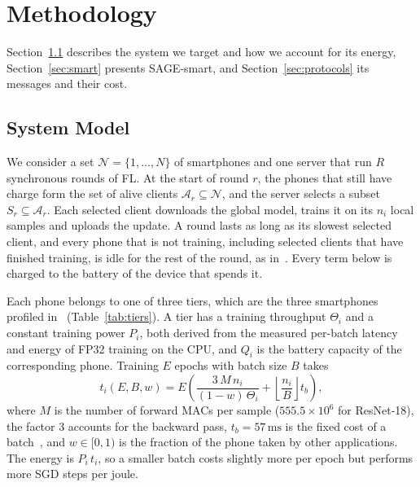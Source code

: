 \section{Methodology}
\label{sec:methodology}

Section~\ref{sec:system} describes the system we target and how we account
for its energy, Section~\ref{sec:smart} presents SAGE-smart, and
Section~\ref{sec:protocols} its messages and their cost.

\subsection{System Model}\label{sec:system}

We consider a set $\mathcal{N}=\{1,\dots,N\}$ of smartphones and one server
that run $R$ synchronous rounds of FL. At the start of round $r$, the phones
that still have charge form the set of alive clients
$\mathcal{A}_r\subseteq\mathcal{N}$, and the server selects a subset
$S_r\subseteq\mathcal{A}_r$. Each selected client downloads the global model,
trains it on its $n_i$ local samples and uploads the update. A round lasts as
long as its slowest selected client, and every phone that is not training,
including selected clients that have finished training, is idle for the rest
of the round, as in~\cite{maciel2024escs}. Every term below is charged to the
battery of the device that spends it.

Each phone belongs to one of three tiers, which are the three smartphones
profiled in~\cite{xu2022mandheling} (Table~\ref{tab:tiers}). A tier has a
training throughput $\Theta_i$ and a constant training power $P_i$, both
derived from the measured per-batch latency and energy of FP32 training on the
CPU, and $Q_i$ is the battery capacity of the corresponding phone. Training $E$
epochs with batch size $B$ takes
\begin{equation}
  t_i(E,B,w) = E\left(\frac{3\,M\,n_i}{(1-w)\,\Theta_i}
             + \left\lfloor\frac{n_i}{B}\right\rfloor t_b\right),
  \label{eq:ttrain}
\end{equation}
where $M$ is the number of forward MACs per sample ($555.5\times10^{6}$ for
ResNet-18), the factor 3 accounts for the backward pass,
$t_b=57\,\mathrm{ms}$ is the fixed cost of a batch~\cite{xu2022mandheling}, and
$w\in[0,1)$ is the fraction of the phone taken by other applications. The
energy is $P_i\,t_i$, so a smaller batch costs slightly more per epoch but
performs more SGD steps per joule.


